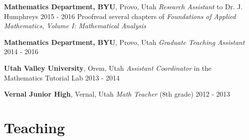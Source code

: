 \documentclass{article}
\begin{document}
\textbf{Mathematics Department, BYU}, Provo, Utah\newline
\emph{Research Assistant} to Dr. J. Humphreys 2015 - 2016\newline
Proofread several chapters of \emph{Foundations of Applied Mathematics, Volume I: Mathematical Analysis}

\textbf{Mathematics Department, BYU}, Provo, Utah\newline
\emph{Graduate Teaching Assistant} 2014 - 2016

\textbf{Utah Valley University}, Orem, Utah\newline
\emph{Assistant Coordinator} in the Mathematics Tutorial Lab 2013 - 2014

\textbf{Vernal Junior High}, Vernal, Utah\newline
\emph{Math Teacher} (8th grade) 2012 - 2013

\section*{Teaching}
\end{document}
